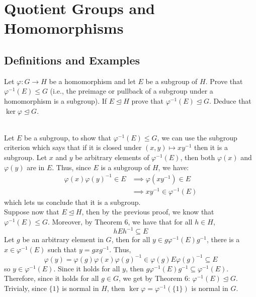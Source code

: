 \chapter{Quotient Groups and Homomorphisms}

\section{Definitions and Examples}

\begin{exercise}
    Let $\varphi : G \to H$ be a homomorphism and let $E$ be a subgroup of $H$. Prove that $\varphi^{-1}(E) \leq G$ (i.e., the preimage or pullback of a subgroup under a homomorphism is a subgroup). If $E \trianglelefteq H$ prove that $\varphi^{-1}(E) \trianglelefteq G$. Deduce that $\ker \varphi \trianglelefteq G$. \\
\end{exercise}

\begin{solution}
    \\ Let $E$ be a subgroup, to show that $\varphi^{-1}(E) \leq G$, we can use the subgroup criterion which says that if it is closed under $(x,y) \mapsto xy^{-1}$ then it is a subgroup. Let $x$ and $y$ be arbitrary elements of $\varphi^{-1}(E)$, then both $\varphi(x)$ and $\varphi(y)$ are in $E$. Thus, since $E$ is a subgroup of $H$, we have:
    \begin{align*}
        \varphi(x)\varphi(y)^{-1} \in E &\implies \varphi(xy^{-1}) \in E \\
        &\implies xy^{-1} \in \varphi^{-1}(E) 
    \end{align*}
    which lets us conclude that it is a subgroup.\\
    Suppose now that $E \trianglelefteq H$, then by the previous proof, we know that $\varphi^{-1}(E) \leq G$. Moreover, by Theorem 6, we have that for all $h \in H$, 
    $$h E h^{-1} \subseteq E$$
    Let $g$ be an arbitrary element in $G$, then for all $y\in g \varphi^{-1}(E) g^{-1}$, there is a $x \in \varphi^{-1}(E)$ such that $y = gxg^{-1}$. Thus,
    $$\varphi(y) = \varphi(g)\varphi(x)\varphi(g)^{-1} \in \varphi(g) E \varphi(g)^{-1} \subseteq E$$
    so $y\in \varphi^{-1}(E)$. Since it holds for all $y$, then $g \varphi^{-1}(E) g^{-1} \subseteq \varphi^{-1}(E)$. Therefore, since it holds for all $g \in G$, we get by Theorem 6: $\varphi^{-1}(E) \trianglelefteq G$. \\
    Trivialy, since $\{1\}$ is normal in $H$, then $\ker \varphi = \varphi^{-1}(\{1\})$ is normal in $G$.\\
\end{solution}

